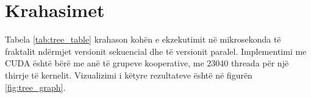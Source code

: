 \section{Krahasimet}

 Tabela \ref{tab:tree_table} krahason kohën e ekzekutimit në mikrosekonda të fraktalit ndërmjet versionit sekuencial dhe të versionit paralel. Implementimi me CUDA është bërë me  anë të grupeve kooperative, me 23040 threada për një thirrje të kernelit. Vizualizimi i këtyre rezultateve është në figurën \ref{fig:tree_graph}.
 
\begin{table}[h]
\centering
{}
\caption{Krahasimi i performancës.}
\label{tab:tree_table}
\end{table}


